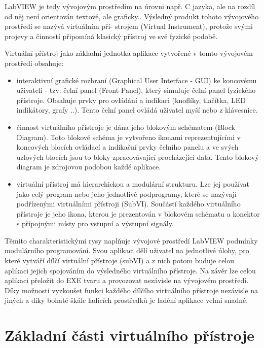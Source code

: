    LabVIEW je tedy vývojovým prostředím na úrovni např. C jazyka, ale na rozdíl od něj není
   orientován textově, ale graficky.. Výsledný produkt tohoto vývojového prostředí se nazývá
   virtuálním pří- strojem (Virtual Instrument), protože svými projevy a činností připomíná klasický
   přístroj ve své fyzické podobě.
  
   Virtuální přístroj jako základní jednotka aplikace vytvořené v tomto vývojovém prostředí
   obsahuje:
   \begin{itemize}
     \item interaktivní grafické rozhraní (Graphical User Interface - GUI) ke koncovému uživateli -
           tzv. čelní panel (Front Panel), který simuluje čelní panel fyzického přístroje. Obsahuje
           prvky pro ovládání a indikaci (knoflíky, tlačítka, LED indikátory, grafy ..). Tento
           čelní panel ovládá uživatel myší nebo z klávesnice.
     \item činnost virtuálního přístroje je dána jeho blokovým schématem (Block Diagram). Toto
           blokové schéma je vytvořeno ikonami reprezentujícími v koncových blocích ovládací a
           indikační prvky čelního panelu a ve svých uzlových blocích jsou to bloky zpracovávající
           procházející data. Tento blokový diagram je zdrojovou podobou každé aplikace.
     \item virtuální přístroj má hierarchickou a modulární strukturu. Lze jej používat jako celý
           program nebo jeho jednotlivé podprogramy, které se nazývají podřízenými virtuálními
           přístroji (SubVI). Součástí každého virtuálního přístroje je jeho ikona, kterou je
           prezentován v blokovém schématu a konektor s přípojnými místy pro vstupní a výstupní
           signály.         
   \end{itemize}
  
   Těmito charakteristickými rysy naplňuje vývojové prostředí LabVIEW podmínky modulárního
   programování. Svou aplikaci dělí uživatel na jednotlivé úlohy, pro které vytváří dílčí virtuální
   přístroje (subVI) a z nich potom buduje celou aplikaci jejich spojováním do výsledného
   virtuálního přístroje. Na závěr lze celou aplikaci přeložit do EXE tvaru a provozovat nezávisle
   na vývojovém prostředí. Díky možnosti vyzkoušet funkci každého dílčího virtuálního přístroje
   nezávisle na jiných a díky bohaté škále ladicích prostředků je ladění aplikace velmi snadné.
   
 \section{Základní části virtuálního přístroje}
